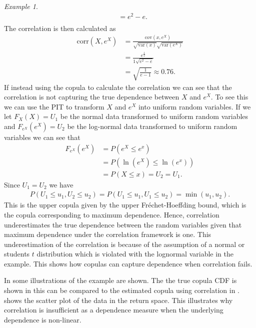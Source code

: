 \documentclass[%
a4paper,							
11pt,								
bibliography=totoc,						
abstracton=true					
]
{scrartcl}
\theoremstyle{plain}
\theoremstyle{definition}
\theoremstyle{remark}
\newtheorem{example}[theorem]{Example}
\newcommand{\1}{\mathbbm{1}}
\begin{document}
\begin{example}
\begin{align*}
        &= e^2 - e.\\
    \end{align*}
    The correlation is then calculated as
    \begin{align*}
        \mathrm{corr}(X,e^X) &= \frac{\mathrm{cov}(x,e^X)}{\sqrt{\mathrm{var}(x)} \sqrt{\mathrm{var}(e^X)}}\\
        & = \frac{e^{\frac{1}{2}}}{1\sqrt{e^2-e}}\\
        &=\sqrt{\frac{1}{e-1}} \approx 0.76. 
    \end{align*}
    If instead using the copula to calculate the correlation we can see that the correlation is not capturing the true dependence between $X$ and $e^X$. To see this we can use the \gls{PIT} to transform $X$ and $e^X$ into uniform random variables. If we let $F_X(X)=U_1$ be the normal data transformed to uniform random variables and $F_{e^X}(e^X)=U_2$ be the log-normal data transformed to uniform random variables we can see that 
    \begin{align*}
        F_{e^X}(e^X) &= P(e^X \leq e^x)\\
        &= P(\ln(e^X) \leq \ln (e^x))\\
        &=P(X\leq x) = U_2 = U_1.
    \end{align*}
    Since $U_1 = U_2$ we have 
    \begin{align*}
        P(U_1\leq u_1, U_2\leq u_2) = P(U_1\leq u_1, U_1\leq u_2) = \min(u_1,u_2).
    \end{align*}
    This is the upper copula given by the upper Fréchet-Hoeffding bound, which is the copula corresponding to maximum dependence. Hence, correlation underestimates the true dependence between the random variables given that maximum dependence under the correlation framework is one. This underestimation of the correlation is because of the assumption of a normal or students $t$ distribution which is violated with the lognormal variable in the example. This shows how copulas can capture dependence when correlation fails.

    In  some illustrations of the example are shown. The the true copula \gls{CDF} is shown in  this can be compared to the estimated copula using correlation in . %
     shows the scatter plot of the data in the return space. This illustrates why correlation is insufficient as a dependence measure when the underlying dependence is non-linear. 
    

\end{example}
\end{document}

